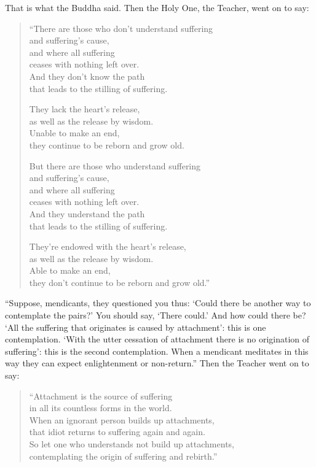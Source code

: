 \documentclass[12pt,openany]{book}%
\begin{document}
That is what the Buddha said. Then the Holy One, the Teacher, went on to say: 

\begin{verse}%
“There are those who don’t understand suffering \\
and suffering’s cause, \\
and where all suffering \\
ceases with nothing left over. \\
And they don’t know the path \\
that leads to the stilling of suffering. 

They lack the heart’s release, \\
as well as the release by wisdom. \\
Unable to make an end, \\
they continue to be reborn and grow old. 

But there are those who understand suffering \\
and suffering’s cause, \\
and where all suffering \\
ceases with nothing left over. \\
And they understand the path \\
that leads to the stilling of suffering. 

They’re endowed with the heart’s release, \\
as well as the release by wisdom. \\
Able to make an end, \\
they don’t continue to be reborn and grow old.” 

%
\end{verse}

“Suppose, mendicants, they questioned you thus: ‘Could there be another way to contemplate the pairs?’ You should say, ‘There could.’ And how could there be? ‘All the suffering that originates is caused by attachment’: this is one contemplation. ‘With the utter cessation of attachment there is no origination of suffering’: this is the second contemplation. When a mendicant meditates in this way they can expect enlightenment or non-return.” Then the Teacher went on to say: 

\begin{verse}%
“Attachment is the source of suffering \\
in all its countless forms in the world. \\
When an ignorant person builds up attachments, \\
that idiot returns to suffering again and again. \\
So let one who understands not build up attachments, \\
contemplating the origin of suffering and rebirth.” 

%
\end{verse}
\end{document}
